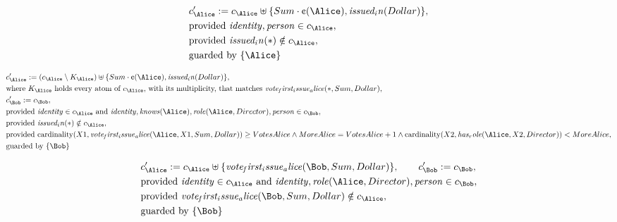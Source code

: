 \begin{align*}
&
c'_
{
\Alice
}
 := 
c_
{
\Alice
}
 \uplus 
\{
Sum
\cdot
\text{\textcent}
(
\Alice
)
,
\mathit{
issued_in
}
(
Dollar
)
\}
,\\
&
\text{provided } 
\mathit{
identity
}
,
\mathit{
person
}
 \in c_
{
\Alice
}
,\\
&
\text{provided } 
\mathit{
issued_in
}
(
\ast
)
 \notin c_
{
\Alice
}
,\\
&
\text{guarded by } \{
\Alice
\}
\end{align*}

\begin{align*}
&
c'_
{
\Alice
}
 := 
(
c_
{
\Alice
}
 \setminus K_
{
\Alice
}
) \uplus 
\{
Sum
\cdot
\text{\textcent}
(
\Alice
)
,
\mathit{
issued_in
}
(
Dollar
)
\}
,\\
&
\text{where } K_
{
\Alice
}
 \text{ holds every atom of } c_
{
\Alice
}
 \text{, with its multiplicity, that matches } 
\mathit{
vote_first_issue_alice
}
(
\ast
,
Sum
,
Dollar
)
,\\
&
c'_
{
\Bob
}
 := 
c_
{
\Bob
}
,\\
&
\text{provided } 
\mathit{
identity
}
 \in c_
{
\Alice
}
 \text{ and } 
\mathit{
identity
}
,
\mathit{
knows
}
(
\Alice
)
,
\mathit{
role
}
(
\Alice
,
Director
)
,
\mathit{
person
}
 \in c_
{
\Bob
}
,\\
&
\text{provided } 
\mathit{
issued_in
}
(
\ast
)
 \notin c_
{
\Alice
}
,\\
&
\text{provided } 
\mathrm{cardinality}(
X1
,
\mathit{
vote_first_issue_alice
}
(
\Alice
,
X1
,
Sum
,
Dollar
)
)
\ge
VotesAlice
\land
MoreAlice
=
VotesAlice
+
1
\land
\mathrm{cardinality}(
X2
,
\mathit{
has_role
}
(
\Alice
,
X2
,
Director
)
)
<
MoreAlice
,\\
&
\text{guarded by } \{
\Bob
\}
\end{align*}

\begin{align*}
&
c'_
{
\Alice
}
 := 
c_
{
\Alice
}
 \uplus 
\{
\mathit{
vote_first_issue_alice
}
(
\Bob
,
Sum
,
Dollar
)
\}
, \qquad 
c'_
{
\Bob
}
 := 
c_
{
\Bob
}
,\\
&
\text{provided } 
\mathit{
identity
}
 \in c_
{
\Alice
}
 \text{ and } 
\mathit{
identity
}
,
\mathit{
role
}
(
\Alice
,
Director
)
,
\mathit{
person
}
 \in c_
{
\Bob
}
,\\
&
\text{provided } 
\mathit{
vote_first_issue_alice
}
(
\Bob
,
Sum
,
Dollar
)
 \notin c_
{
\Alice
}
,\\
&
\text{guarded by } \{
\Bob
\}
\end{align*}
